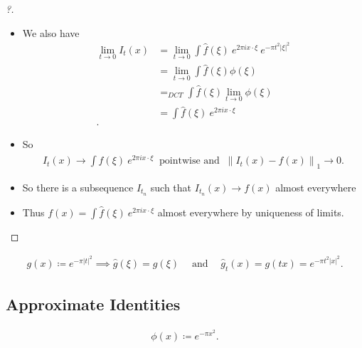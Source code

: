 \begin{proof}[?]
\begin{itemize}
\item
  We also have
  \begin{align*}
  \lim_{t\to 0} I_{t}(x)
  &= 
  \lim_{t\to 0} \int \widehat{f}(\xi) ~e^{2\pi i x \cdot \xi} ~e^{-\pi t^2 {\left\lvert {\xi} \right\rvert}^2} \\
  &= 
  \lim_{t\to 0} \int \widehat{f}(\xi) \phi(\xi) \\
  &=_{DCT} 
  \int \widehat{f}(\xi) \lim_{t\to 0} \phi(\xi) \\
  &=
  \int \widehat{f}(\xi) ~e^{2\pi i x \cdot \xi} \\
  .\end{align*}
\item
  So
  \begin{align*}
  I_{t}(x) \to \int \widehat{f}(\xi) ~e^{2\pi i x \cdot \xi} ~\text{ pointwise and }~{\left\lVert {I_{t}(x) - f(x)} \right\rVert}_{1} \to 0
  .\end{align*}
\item
  So there is a subsequence \(I_{t_{n}}\) such that
  \(I_{t_{n}}(x) \to f(x)\) almost everywhere
\item
  Thus \(f(x) = \int \widehat{f}(\xi) ~e^{2\pi i x \cdot \xi}\) almost
  everywhere by uniqueness of limits.
\end{itemize}

\end{proof}

\begin{proposition}

\begin{align*}
g(x) \coloneqq e^{-\pi {\left\lvert {t} \right\rvert}^2} \implies \widehat{g}(\xi) = g(\xi) {\quad \operatorname{and} \quad}
\widehat{g}_{t}(x) = g(tx) = e^{-\pi t^2 {\left\lvert {x} \right\rvert}^2}
.\end{align*}

\end{proposition}

\hypertarget{approximate-identities}{%
\subsection{Approximate Identities}\label{approximate-identities}}

\begin{example}

\begin{align*}
\phi(x) \coloneqq e^{-\pi x^2}
.\end{align*}

\end{example}

